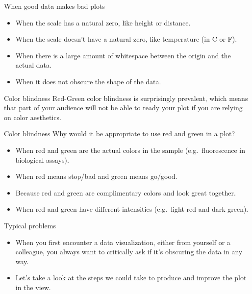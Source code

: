 \documentclass[
  ignorenonframetext,
]{beamer}
\begin{document}
\begin{frame}{When good data makes bad plots}
\label{when-good-data-makes-bad-plots-1}
\begin{itemize}
\item
  When the scale has a natural zero, like height or distance.
\item
  When the scale doesn't have a natural zero, like temperature (in C or
  F).
\item
  When there is a large amount of whitespace between the origin and the
  actual data.
\item
  When it does not obscure the shape of the data.
\end{itemize}
\end{frame}

\begin{frame}{Color blindness}
\label{color-blindness}
Red-Green color blindness is surprisingly prevalent, which means that
part of your audience will not be able to ready your plot if you are
relying on color aesthetics.
\end{frame}

\begin{frame}{Color blindness}
\label{color-blindness-1}
Why would it be appropriate to use red and green in a plot?

\begin{itemize}
\item
  When red and green are the actual colors in the sample
  (e.g.~fluorescence in biological assays).
\item
  When red means stop/bad and green means go/good.
\item
  Because red and green are complimentary colors and look great
  together.
\item
  When red and green have different intensities (e.g.~light red and dark
  green).
\end{itemize}
\end{frame}

\begin{frame}{Typical problems}
\label{typical-problems}
\begin{itemize}
\item
  When you first encounter a data visualization, either from yourself or
  a colleague, you always want to critically ask if it's obscuring the
  data in any way.
\item
  Let's take a look at the steps we could take to produce and improve
  the plot in the view.
\end{itemize}
\end{frame}
\end{document}
